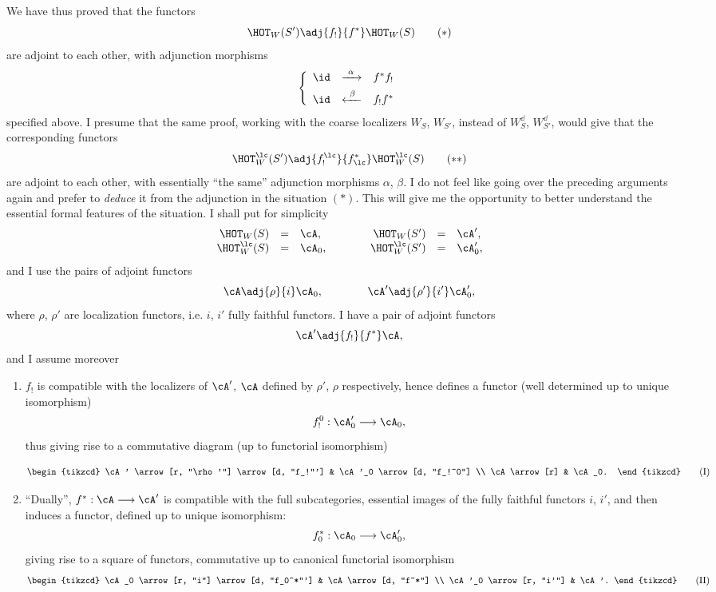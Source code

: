 
We have thus proved that the functors
\[
\HOT_W(S') \adj{f_!}{f^*} \HOT_W(S)
\tag*{$(*)$}
\]
are adjoint to each other, with adjunction morphisms
\[
\left\{
\begin{array}{lcl}
\id & \xrightarrow{\ \alpha\ } & f^*f_! \\[1ex]
\id & \xleftarrow{\ \beta\ } & f_!f^*
\end{array}
\right.
\]
specified above. I presume that the same proof, working with the coarse localizers $W_S$, $W_{S'}$, instead of $W^{\dd}_S$, $W^{\dd}_{S'}$, would give that the corresponding functors
\[
\HOT^{\lc}_W(S') \adj{f_!^{\lc}}{f^*_{\lc}} \HOT^{\lc}_W(S)
\tag*{$(**)$}
\]
are adjoint to each other, with essentially ``the same'' adjunction morphisms $\alpha$, $\beta$. I do not feel like going over the preceding arguments again and prefer to \textit{deduce} it from the adjunction in the situation $(*)$. This will give me the opportunity to better understand the essential formal features of the situation. I shall put for simplicity
\[
\begin{array}{rcl@{\qquad\qquad}rcl}
\HOT_W(S) & = & \cA, & \HOT_W(S') & = & \cA', \\
\HOT^{\lc}_W(S) & = & \cA_0, & \HOT^{\lc}_W(S') & = & \cA'_0,
\end{array}
\]
and I use the pairs of adjoint functors
\[
\cA \adj{\rho}{i} \cA_0, \qquad\qquad \cA' \adj{\rho'}{i'} \cA'_0,
\]
where $\rho$, $\rho'$ are localization functors, i.e. $i$, $i'$ fully faithful functors. I have a pair of adjoint functors
\[
\cA' \adj{f_!}{f^*} \cA,
\]
and I assume moreover

\begin{enumerate}
\item[a)] $f_!$ is compatible with the localizers of $\cA'$, $\cA$ defined by $\rho'$, $\rho$ respectively, hence defines a functor (well determined up to unique isomorphism)
\[
f_!^0 : \cA'_0 \longrightarrow \cA_0,
\]
thus giving rise to a commutative diagram (up to functorial isomorphism)


\[
\begin{tikzcd}
\cA' \arrow[r, "\rho'"] \arrow[d, "f_!"'] & \cA'_0 \arrow[d, "f_!^0"] \\
\cA \arrow[r] & \cA_0.
\end{tikzcd}
\tag*{(I)}
\]


\item[b)] ``Dually'', $f^* : \cA \longrightarrow \cA'$ is compatible with the full subcategories, essential images of the fully faithful functors $i$, $i'$, and then induces
a functor, defined up to unique isomorphism:
\[
f_0^* : \cA_0 \longrightarrow \cA'_0,
\]
giving rise to a square of functors, commutative up to canonical functorial isomorphism
\[
\begin{tikzcd}
\cA_0 \arrow[r, "i"] \arrow[d, "f_0^*"'] & \cA \arrow[d, "f^*"] \\
\cA'_0 \arrow[r, "i'"] & \cA'.
\end{tikzcd}
\tag*{(II)}
\]
\end{enumerate}

